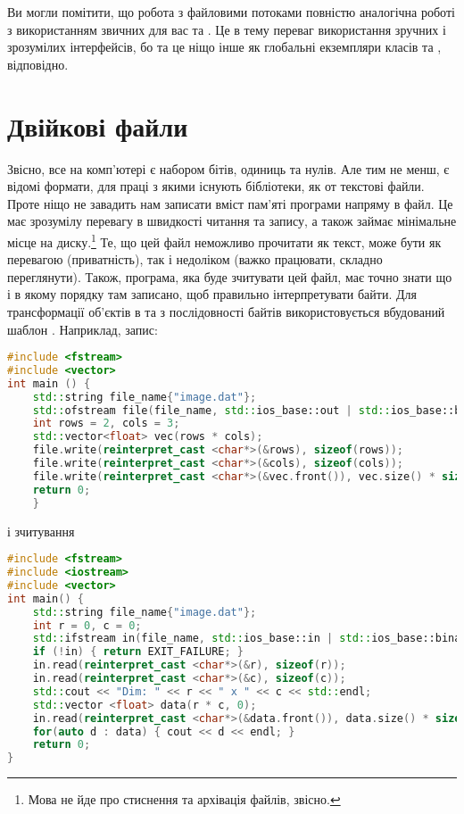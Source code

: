 \documentclass[12pt]{article}
\begin{document}
    Ви могли помітити, що робота з файловими потоками повністю аналогічна роботі з використанням звичних для вас  та . Це в тему переваг використання зручних і зрозумілих інтерфейсів, бо  та  це ніщо інше як глобальні екземпляри класів  та , відповідно.

    \section{Двійкові файли}
    Звісно, все на комп'ютері є набором бітів, одиниць та нулів. Але тим не менш, є відомі формати, для праці з якими існують бібліотеки, як от текстові файли. Проте ніщо не завадить нам записати вміст пам'яті програми напряму в файл. Це має зрозумілу перевагу в швидкості читання та запису, а також займає мінімальне місце на диску.\footnote{Мова не йде про стиснення та архівація файлів, звісно.} Те, що цей файл неможливо прочитати як текст, може бути як перевагою (приватність), так і недоліком (важко працювати, складно переглянути). Також, програма, яка буде зчитувати цей файл, має точно знати що і в якому порядку там записано, щоб правильно інтерпретувати байти. Для трансформації об'єктів в та з послідовності байтів використовується вбудований шаблон \href{https://en.cppreference.com/w/cpp/language/reinterpret_cast}{}. Наприклад, запис:
    \begin{lstlisting}[language=c++]
#include <fstream>
#include <vector>        
int main () {
    std::string file_name{"image.dat"};
    std::ofstream file(file_name, std::ios_base::out | std::ios_base::binary);
    int rows = 2, cols = 3;
    std::vector<float> vec(rows * cols);
    file.write(reinterpret_cast <char*>(&rows), sizeof(rows));
    file.write(reinterpret_cast <char*>(&cols), sizeof(cols));
    file.write(reinterpret_cast <char*>(&vec.front()), vec.size() * sizeof(float));
    return 0;
    }
    \end{lstlisting}
    і зчитування
    \begin{lstlisting}[language=c++]      
#include <fstream>
#include <iostream>
#include <vector>
int main() {
    std::string file_name{"image.dat"};
    int r = 0, c = 0;
    std::ifstream in(file_name, std::ios_base::in | std::ios_base::binary);
    if (!in) { return EXIT_FAILURE; }
    in.read(reinterpret_cast <char*>(&r), sizeof(r));
    in.read(reinterpret_cast <char*>(&c), sizeof(c));
    std::cout << "Dim: " << r << " x " << c << std::endl;
    std::vector <float> data(r * c, 0);
    in.read(reinterpret_cast <char*>(&data.front()), data.size() * sizeof(data.front()));
    for(auto d : data) { cout << d << endl; }
    return 0;
}  
    \end{lstlisting}
\end{document}
